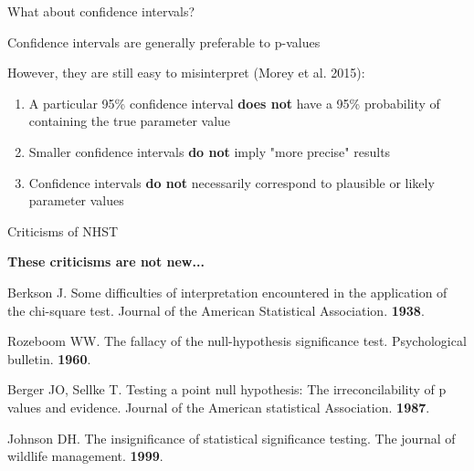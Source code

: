 \documentclass[12pt,aspectratio=169]{beamer}
\begin{document}

\begin{frame}{What about confidence intervals?}

Confidence intervals are generally preferable to p-values
\pause

However, they are still easy to misinterpret (Morey et al. 2015):

\begin{enumerate}[<+->]
    \item A particular 95\% confidence interval \textbf{does not} have a 95\% probability of containing the true parameter value
    \newline
    \item Smaller confidence intervals \textbf{do not} imply "more precise" results
    \newline
    \item Confidence intervals \textbf{do not} necessarily correspond to plausible or likely parameter values
\end{enumerate}

\end{frame}

\begin{frame}{Criticisms of NHST}

\textbf{These criticisms are not new...}

Berkson J. Some difficulties of interpretation encountered in the application of the chi-square test. Journal of the American Statistical Association. \textbf{1938}.

Rozeboom WW. The fallacy of the null-hypothesis significance test. Psychological bulletin. \textbf{1960}.

Berger JO, Sellke T. Testing a point null hypothesis: The irreconcilability of p values and evidence. Journal of the American statistical Association. \textbf{1987}.

Johnson DH. The insignificance of statistical significance testing. The journal of wildlife management. \textbf{1999}.

\end{frame}
\end{document}
